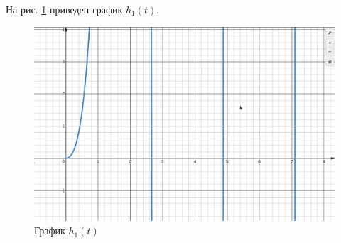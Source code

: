 На рис. \ref{fig:h_1_t} приведен график $ h_1(t) $.

\begin{figure}[H]
    \centering
    \includegraphics[width=0.7\linewidth]{photo/h_1_t}
    \caption{График $ h_1(t) $}
    \label{fig:h_1_t}
\end{figure}